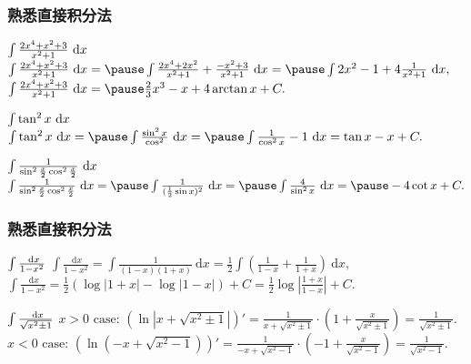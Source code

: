 \documentclass[
10pt,
aspectratio=43,
]{beamer}
\begin{document}
\begin{frame}
	\frametitle{熟悉直接积分法}
	\everymath{\displaystyle}
	{\small
		\begin{exampleblock}{$\color{black}\int \frac{2 x^4+x^2+3}{x^2+1} \mathrm{~d} x$}
			$
				\int \frac{2 x^4+x^2+3}{x^2+1} \mathrm{~d} x =\pause \int \frac{2 x^4+2x^2}{x^2+1}+\frac{-x^2+3}{x^2+1} \mathrm{~d} x =\pause \int 2x^2-1+4 \frac{1}{x^2+1}\mathrm{~d} x,
			$
			\pause
			$
				\int \frac{2 x^4+x^2+3}{x^2+1} \mathrm{~d} x = \pause\frac{2}{3}x^3-x+4\arctan x+ C.
			$
		\end{exampleblock}
		\pause
		\begin{exampleblock}{$\color{black}\int \tan^2 x \mathrm{~d} x$}
			$
				\int \tan^2 x \mathrm{~d} x =\pause \int \frac{\sin^2 x}{\cos^2}\mathrm{~d} x =\pause \int \frac{1}{\cos^2 x}-1\mathrm{~d} x=\tan x-x+C.
			$
		\end{exampleblock}
		\pause
		\begin{exampleblock}{$\color{black}\int \frac{1}{\sin ^2 \frac{x}{2} \cos ^2 \frac{x}{2}} \mathrm{~d} x$}
			$
				\int \frac{1}{\sin ^2 \frac{x}{2} \cos ^2 \frac{x}{2}} \mathrm{~d} x =\pause \int \frac{1}{(\frac{1}{2}\sin x)^2} \mathrm{~d} x =\pause \int \frac{4}{\sin^2 x}\mathrm{~d} x=\pause-4\cot x+C.
			$
		\end{exampleblock}
	}
\end{frame}

\begin{frame}
	\frametitle{熟悉直接积分法}
	\everymath{\displaystyle}
	{\small
		\begin{exampleblock}{$\color{black}\int \frac{\mathrm{~d} x}{1-x^2}$}
			$
				\int \frac{\mathrm{~d} x}{1-x^2}= \int \frac{1}{(1-x)(1+x)}\mathrm{~d} x=\frac{1}{2}\int \left(\frac{1}{1-x}+\frac{1}{1+x}\right)\mathrm{~d} x,
			$
			\\
			$
				\int \frac{\mathrm{~d} x}{1-x^2}=\frac{1}{2}(\log|1+x|-\log|1-x|)+C=\frac{1}{2}\log\left|\frac{1+x}{1-x}\right|+C.
			$
		\end{exampleblock}
		\pause
		\begin{alertblock}{$\color{black}\int \frac{\mathrm{~d} x}{\sqrt{x^2 \pm 1}}$}
			$
				x>0\,\,\text{case:}\,\, \left(\ln|x+\sqrt{x^2\pm1}|\right)'=\frac{1}{x+\sqrt{x^2\pm1}}\cdot\left(1+\frac{x}{\sqrt{x^2\pm1}}\right)=\frac{1}{\sqrt{x^2\pm1}}.
			$
			\\\vspace{0.2cm}
			$
				x<0\,\,\text{case:}\,\, \left(\ln(-x+\sqrt{x^2-1})\right)'=\frac{1}{-x+\sqrt{x^2-1}}\cdot\left(-1+\frac{x}{\sqrt{x^2-1}}\right)=\frac{1}{\sqrt{x^2-1}}.
			$
		\end{alertblock}
	}
\end{frame}
\end{document}
